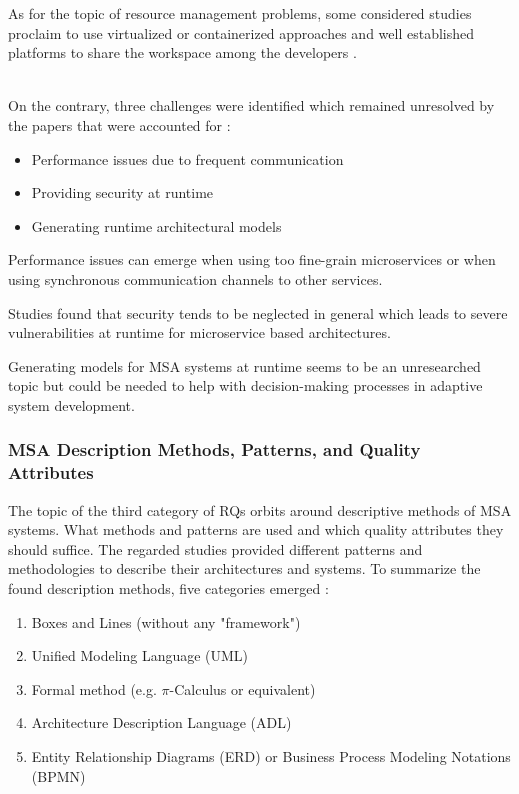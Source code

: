 As for the topic of resource management problems, some considered
studies proclaim to use virtualized or containerized approaches
and well established platforms to share the workspace among
the developers \cite{waseem:SMSMSADevOps}.

~\\
On the contrary, three challenges were identified which
remained unresolved by the papers that were accounted for \cite{waseem:SMSMSADevOps}:

\begin{itemize}
    \item Performance issues due to frequent communication
    \item Providing security at runtime
    \item Generating runtime architectural models
\end{itemize}

Performance issues can emerge when using too fine-grain microservices
or when using synchronous communication channels to other services.

Studies found that security tends to be neglected in general which leads
to severe vulnerabilities at runtime for microservice based architectures.

Generating models for MSA systems at runtime seems to be an unresearched
topic but could be needed to help with decision-making processes in
adaptive system development.

\subsubsection{MSA Description Methods, Patterns, and Quality Attributes}

The topic of the third category of RQs orbits around descriptive methods
of MSA systems. What methods and patterns are used and which
quality attributes they should suffice. The regarded studies provided
different patterns and methodologies to describe their architectures
and systems. To summarize the found description methods, five categories
emerged \cite{waseem:SMSMSADevOps}:

\begin{enumerate}
    \item Boxes and Lines (without any "framework")
    \item Unified Modeling Language (UML)
    \item Formal method (e.g. $\pi$-Calculus or equivalent)
    \item Architecture Description Language (ADL)
    \item Entity Relationship Diagrams (ERD) or Business
          Process Modeling Notations (BPMN)
\end{enumerate}

